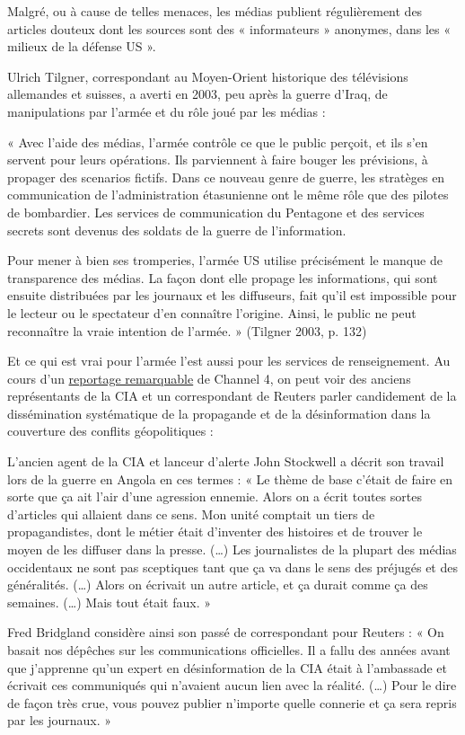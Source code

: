 Malgré, ou à cause de telles menaces, les médias publient régulièrement
des articles douteux dont les sources sont des « informateurs »
anonymes, dans les « milieux de la défense US ».

Ulrich Tilgner, correspondant au Moyen-Orient historique des télévisions
allemandes et suisses, a averti en 2003, peu après la guerre d'Iraq, de
manipulations par l'armée et du rôle joué par les médias :

« Avec l'aide des médias, l'armée contrôle ce que le public perçoit, et
ils s'en servent pour leurs opérations. Ils parviennent à faire bouger
les prévisions, à propager des scenarios fictifs. Dans ce nouveau genre
de guerre, les stratèges en communication de l'administration
étasunienne ont le même rôle que des pilotes de bombardier. Les services
de communication du Pentagone et des services secrets sont devenus des
soldats de la guerre de l'information.

Pour mener à bien ses tromperies, l'armée US utilise précisément le
manque de transparence des médias. La façon dont elle propage les
informations, qui sont ensuite distribuées par les journaux et les
diffuseurs, fait qu'il est impossible pour le lecteur ou le spectateur
d'en connaître l'origine. Ainsi, le public ne peut reconnaître la vraie
intention de l'armée. » (Tilgner 2003, p. 132)

Et ce qui est vrai pour l'armée l'est aussi pour les services de
renseignement. Au cours d'un
\href{https://swprs.org/video-the-cia-and-the-media/}{reportage
remarquable} de Channel 4, on peut voir des anciens représentants de la
CIA et un correspondant de Reuters parler candidement de la
dissémination systématique de la propagande et de la désinformation dans
la couverture des conflits géopolitiques :

L'ancien agent de la CIA et lanceur d'alerte John Stockwell a décrit son
travail lors de la guerre en Angola en ces termes : « Le thème de base
c'était de faire en sorte que ça ait l'air d'une agression ennemie.
Alors on a écrit toutes sortes d'articles qui allaient dans ce sens. Mon
unité comptait un tiers de propagandistes, dont le métier était
d'inventer des histoires et de trouver le moyen de les diffuser dans la
presse. (\ldots{}) Les journalistes de la plupart des médias occidentaux
ne sont pas sceptiques tant que ça va dans le sens des préjugés et des
généralités. (\ldots{}) Alors on écrivait un autre article, et ça durait
comme ça des semaines. (\ldots{}) Mais tout était faux. »

Fred Bridgland considère ainsi son passé de correspondant pour Reuters :
« On basait nos dépêches sur les communications officielles. Il a fallu
des années avant que j'apprenne qu'un expert en désinformation de la CIA
était à l'ambassade et écrivait ces communiqués qui n'avaient aucun lien
avec la réalité. (\ldots{}) Pour le dire de façon très crue, vous pouvez
publier n'importe quelle connerie et ça sera repris par les journaux. »

